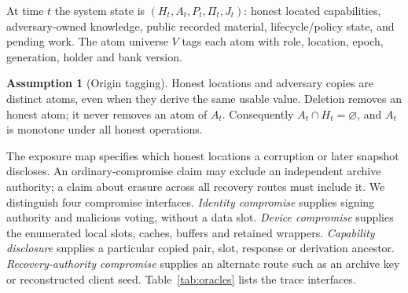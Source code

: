 \documentclass[pdflatex,sn-mathphys-num]{sn-jnl}%
\theoremstyle{plain}
\theoremstyle{definition}
\newtheorem{assumption}{Assumption}
\begin{document}
At time $t$ the system state is $(H_t,A_t,P_t,\Pi_t,J_t)$: honest located capabilities, adversary-owned knowledge, public recorded material, lifecycle/policy state, and pending work. The atom universe $V$ tags each atom with role, location, epoch, generation, holder and bank version.

\begin{assumption}[Origin tagging]\label{ass:origin}
Honest locations and adversary copies are distinct atoms, even when they derive the same usable value. Deletion removes an honest atom; it never removes an atom of $A_t$. Consequently $A_t\cap H_t=\varnothing$, and $A_t$ is monotone under all honest operations.
\end{assumption}

The exposure map specifies which honest locations a corruption or later snapshot discloses. An ordinary-compromise claim may exclude an independent archive authority; a claim about erasure across all recovery routes must include it. We distinguish four compromise interfaces. \emph{Identity compromise} supplies signing authority and malicious voting, without a data slot. \emph{Device compromise} supplies the enumerated local slots, caches, buffers and retained wrappers. \emph{Capability disclosure} supplies a particular copied pair, slot, response or derivation ancestor. \emph{Recovery-authority compromise} supplies an alternate route such as an archive key or reconstructed client seed. Table~\ref{tab:oracles} lists the trace interfaces.
\end{document}
